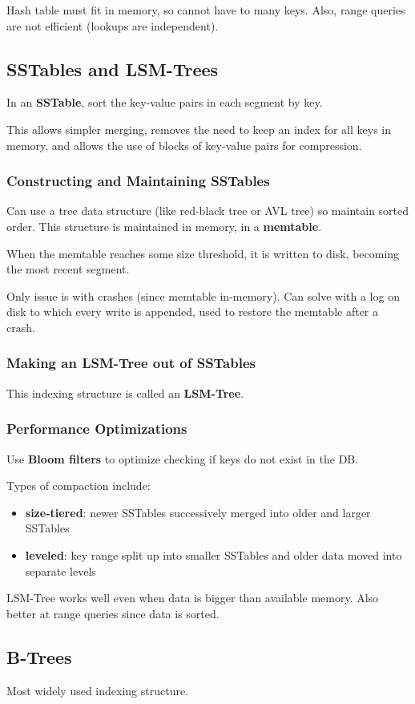 \documentclass[11pt]{article}
\begin{document}
Hash table must fit in memory, so cannot have to many keys.
Also, range queries are not efficient (lookups are independent).
\subsection{SSTables and LSM-Trees}
\label{sec:orgbf26492}
In an \textbf{SSTable}, sort the key-value pairs in each segment by key.

This allows simpler merging, removes the need to keep an index for all
keys in memory, and allows the use of blocks of key-value pairs for
compression.
\subsubsection{Constructing and Maintaining SSTables}
\label{sec:org0c31725}
Can use a tree data structure (like red-black tree or AVL tree) so
maintain sorted order.
This structure is maintained in memory, in a \textbf{memtable}.

When the memtable reaches some size threshold, it is written to
disk, becoming the most recent segment.

Only issue is with crashes (since memtable in-memory).
Can solve with a log on disk to which every write is appended,
used to restore the memtable after a crash.
\subsubsection{Making an LSM-Tree out of SSTables}
\label{sec:orgad03099}
This indexing structure is called an \textbf{LSM-Tree}.
\subsubsection{Performance Optimizations}
\label{sec:orgaaef16d}
Use \textbf{Bloom filters} to optimize checking if keys do not exist in
the DB.

Types of compaction include:
\begin{itemize}
\item \textbf{size-tiered}: newer SSTables successively merged into older and
larger SSTables
\item \textbf{leveled}: key range split up into smaller SSTables and older
data moved into separate levels
\end{itemize}

LSM-Tree works well even when data is bigger than available memory.
Also better at range queries since data is sorted.
\subsection{B-Trees}
\label{sec:org0906a2a}
Most widely used indexing structure.
\end{document}
